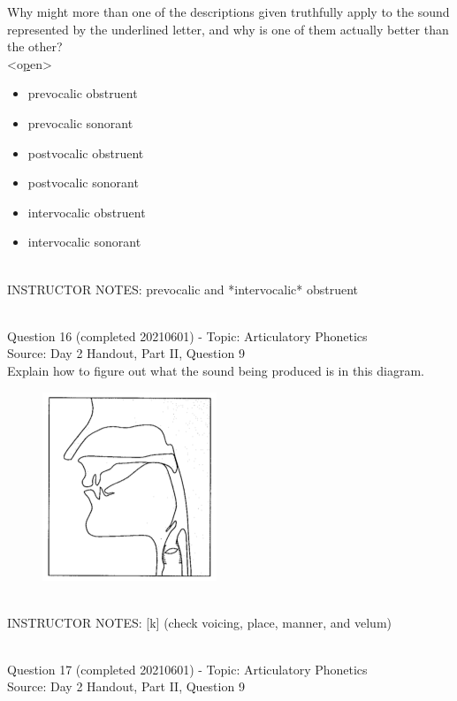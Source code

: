 \documentclass[12pt]{article}
\begin{document}
Why might more than one of the descriptions given truthfully apply to the sound represented by the underlined letter, and why is one of them actually better than the other?\\

<o\underline{p}en>

\begin{itemize} \item prevocalic obstruent \item prevocalic sonorant \item postvocalic obstruent \item postvocalic sonorant \item intervocalic obstruent \item intervocalic sonorant \end{itemize}


~\\
INSTRUCTOR NOTES: prevocalic and *intervocalic* obstruent


~\\

{\large Question 16} (completed 20210601) - Topic: Articulatory Phonetics\\
Source: Day 2 Handout, Part II, Question 9\\

Explain how to figure out what the sound being produced is in this diagram.\\

\begin{figure}[H]
\includegraphics{../images/sagittal_k.png}
\end{figure}

~\\
INSTRUCTOR NOTES: [k] (check voicing, place, manner, and velum)


~\\

{\large Question 17} (completed 20210601) - Topic: Articulatory Phonetics\\
Source: Day 2 Handout, Part II, Question 9\\
\end{document}
